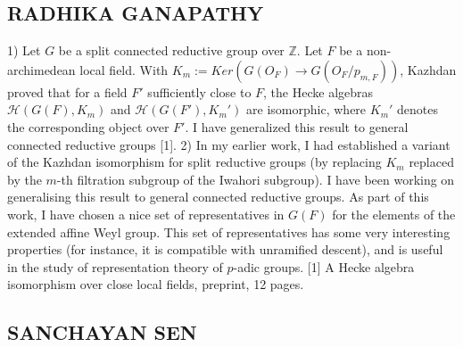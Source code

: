 \subsection{RADHIKA GANAPATHY}

1) Let $G$ be a split connected reductive group over $\mathbb{Z}$. Let $F$ be a non-archimedean local field. With $K_m := Ker(G(O_F ) → G(O_F /p_{m,F} ))$, Kazhdan proved that for a field $F′$ sufficiently close to $F$, the Hecke algebras $\mathcal{H}(G(F), K_m)$ and $\mathcal{H}(G(F′), K_m′ )$ are isomorphic, where $K_m′$ denotes the corresponding object over $F′$. I have generalized this result to general connected reductive groups [1].  2) In my earlier work, I had established  a variant of the Kazhdan isomorphism for split reductive groups (by replacing $K_m$ replaced by the $m$-th filtration subgroup of the Iwahori subgroup). I have been working on generalising this result to general connected reductive groups. As part of this work, I have chosen a nice set of representatives in $G(F)$ for the elements of the extended affine Weyl group. This set of representatives has some very interesting properties (for instance, it is compatible with unramified descent), and is useful in the study of representation theory of $p$-adic groups.   [1] A Hecke algebra isomorphism over close local fields, preprint, 12 pages. 


\subsection{SANCHAYAN SEN}

